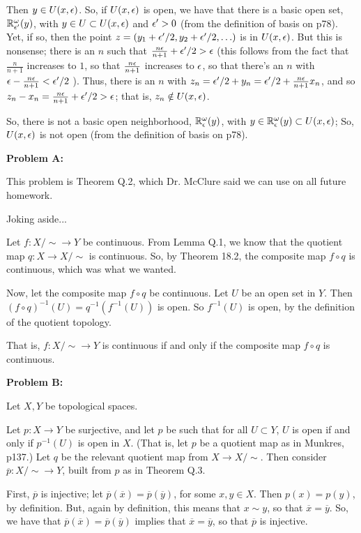 \documentclass[a4paper,12pt]{article}
\begin{document}
Then $y \in U(x,\epsilon)$. So, if $U(x,\epsilon)$ is open, we have that there is a basic open set, $\mathbb{R}^\omega_{\epsilon'}(y)$, with $y \in U \subset U(x,\epsilon)$ and $\epsilon'>0$ (from the definition of basis on p78). Yet, if so, then the point $z = (y_1+\epsilon'/2, y_2+\epsilon'/2, \ldots)$ is in $U(x,\epsilon)$. But this is nonsense;  there is an $n$ such that $\frac{n\epsilon}{n+1} + \epsilon'/2 > \epsilon$ (this follows from the fact that $\frac{n}{n+1}$ increases to $1$, so that $\frac{n\epsilon}{n+1}$ increases to $\epsilon$, so that there's an $n$ with $\epsilon -\frac{n\epsilon}{n+1} < \epsilon'/2$ ). Thus, there is an $n$ with $z_n = \epsilon'/2 + y_n = \epsilon'/2 + \frac{n\epsilon}{n+1} x_n$, and so $z_n-x_n = \frac{n\epsilon}{n+1} + \epsilon'/2 > \epsilon$; that is, $z_n \notin U(x,\epsilon)$.

So, there is not a basic open neighborhood, $\mathbb{R}^\omega_\epsilon(y)$, with $y \in \mathbb{R}^\omega_\epsilon(y) \subset U(x,\epsilon)$; So, $U(x,\epsilon)$ is not open (from the definition of basis on p78).

\shunt

{\bf Problem A:}

This problem is Theorem Q.2, which Dr. McClure said we can use on all future homework.

Joking aside...

Let $f: X/\sim \to Y$ be continuous. From Lemma Q.1, we know that the quotient map $q: X \to X/\sim$ is continuous. So, by Theorem 18.2, the composite map $f \circ q$ is continuous, which was what we wanted.

Now, let the composite map $f \circ q$ be continuous. Let $U$ be an open set in $Y$. Then $(f \circ q)^{-1}(U)= q^{-1}(f^{-1}(U))$ is open. So $f^{-1}(U)$ is open, by the definition of the quotient topology.

That is, $f: X/\sim \to Y$ is continuous if and only if the composite map $f \circ q$ is continuous.

\shunt

{\bf Problem B:}

Let $X, Y$ be topological spaces.

Let $p: X \to Y$ be surjective, and let $p$ be such that for all $U \subset Y$, $U$ is open if and only if $p^{-1}(U)$ is open in $X$. (That is, let $p$ be a quotient map as in Munkres, p137.) Let $q$ be the relevant quotient map from $X \to X/\sim$. Then consider $\overline{p}: X/\sim \to Y$, built from $p$ as in Theorem Q.3.

First, $\overline{p}$ is injective; let $\overline{p}(\overline{x}) = \overline{p}(\overline{y})$, for some $x, y \in X$. Then $p(x) = p(y)$, by definition. But, again by definition, this means that $x \sim y$, so that $\overline{x} = \overline{y}$. So, we have that $\overline{p}(\overline{x}) = \overline{p}(\overline{y})$ implies that $\overline{x} = \overline{y}$, so that $\overline{p}$ is injective.
\end{document}
